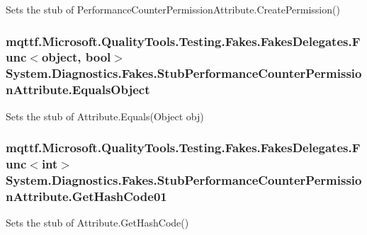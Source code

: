 Sets the stub of Performance\-Counter\-Permission\-Attribute.\-Create\-Permission()

\hypertarget{class_system_1_1_diagnostics_1_1_fakes_1_1_stub_performance_counter_permission_attribute_af76016d8c2dd3222390676cb6d213a06}{
\subsubsection[{Equals\-Object}]{\setlength{\rightskip}{0pt plus 5cm}mqttf.\-Microsoft.\-Quality\-Tools.\-Testing.\-Fakes.\-Fakes\-Delegates.\-Func$<$object, bool$>$ System.\-Diagnostics.\-Fakes.\-Stub\-Performance\-Counter\-Permission\-Attribute.\-Equals\-Object}}\label{class_system_1_1_diagnostics_1_1_fakes_1_1_stub_performance_counter_permission_attribute_af76016d8c2dd3222390676cb6d213a06}


Sets the stub of Attribute.\-Equals(\-Object obj)

\hypertarget{class_system_1_1_diagnostics_1_1_fakes_1_1_stub_performance_counter_permission_attribute_ac89609c09c8f7fb5d2bdcd1bb078560e}{
\subsubsection[{Get\-Hash\-Code01}]{\setlength{\rightskip}{0pt plus 5cm}mqttf.\-Microsoft.\-Quality\-Tools.\-Testing.\-Fakes.\-Fakes\-Delegates.\-Func$<$int$>$ System.\-Diagnostics.\-Fakes.\-Stub\-Performance\-Counter\-Permission\-Attribute.\-Get\-Hash\-Code01}}\label{class_system_1_1_diagnostics_1_1_fakes_1_1_stub_performance_counter_permission_attribute_ac89609c09c8f7fb5d2bdcd1bb078560e}


Sets the stub of Attribute.\-Get\-Hash\-Code()

